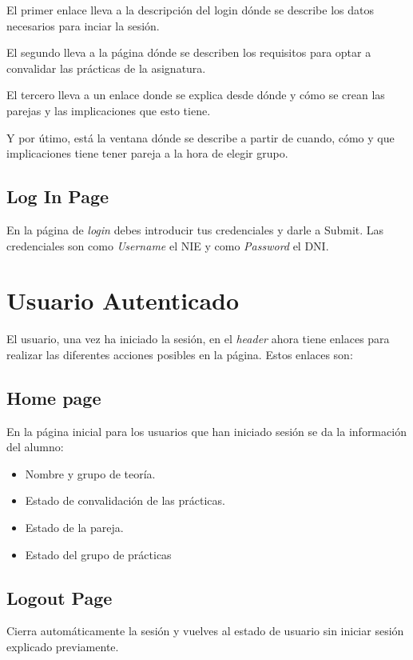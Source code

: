 \documentclass{article}
\begin{document}
El primer enlace lleva a la descripción del login dónde se describe los datos necesarios
para inciar la sesión.

El segundo lleva a la página dónde se describen los requisitos para optar a convalidar las
prácticas de la asignatura.

El tercero lleva a un enlace donde se explica desde dónde y cómo se crean las parejas y las
implicaciones que esto tiene.

Y por útimo, está la ventana dónde se describe a partir de cuando, cómo y que implicaciones tiene
tener pareja a la hora de elegir grupo.


\subsection*{Log In Page}

En la página de \textit{login} debes introducir tus credenciales y darle a Submit. Las credenciales
son como \textit{Username} el NIE y como \textit{Password} el DNI.


\section*{Usuario Autenticado}

El usuario, una vez ha iniciado la sesión, en el \textit{header} ahora tiene enlaces para realizar
las diferentes acciones posibles en la página. Estos enlaces son:


\subsection*{Home page}

En la página inicial para los usuarios que han iniciado sesión se da la información del alumno:
\begin{itemize}
    \item Nombre y grupo de teoría.
    \item Estado de convalidación de las prácticas.
    \item Estado de la pareja.
    \item Estado del grupo de prácticas 
\end{itemize}


\subsection*{Logout Page}

Cierra automáticamente la sesión y vuelves al estado de usuario sin iniciar sesión explicado previamente.
\end{document}
